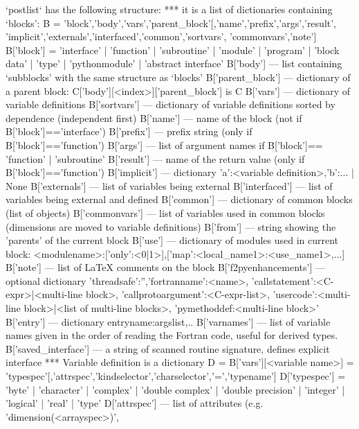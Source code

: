 \begin{DoxyVerb}
  `postlist` has the following structure:
 *** it is a list of dictionaries containing `blocks':
     B = {'block','body','vars','parent_block'[,'name','prefix','args','result',
  'implicit','externals','interfaced','common','sortvars',
  'commonvars','note']}
     B['block'] = 'interface' | 'function' | 'subroutine' | 'module' |
          'program' | 'block data' | 'type' | 'pythonmodule' |
          'abstract interface'
     B['body'] --- list containing `subblocks' with the same structure as `blocks'
     B['parent_block'] --- dictionary of a parent block:
                     C['body'][<index>]['parent_block'] is C
     B['vars'] --- dictionary of variable definitions
     B['sortvars'] --- dictionary of variable definitions sorted by dependence (independent first)
     B['name'] --- name of the block (not if B['block']=='interface')
     B['prefix'] --- prefix string (only if B['block']=='function')
     B['args'] --- list of argument names if B['block']== 'function' | 'subroutine'
     B['result'] --- name of the return value (only if B['block']=='function')
     B['implicit'] --- dictionary {'a':<variable definition>,'b':...} | None
     B['externals'] --- list of variables being external
     B['interfaced'] --- list of variables being external and defined
     B['common'] --- dictionary of common blocks (list of objects)
     B['commonvars'] --- list of variables used in common blocks (dimensions are moved to variable definitions)
     B['from'] --- string showing the 'parents' of the current block
     B['use'] --- dictionary of modules used in current block:
 {<modulename>:{['only':<0|1>],['map':{<local_name1>:<use_name1>,...}]}}
     B['note'] --- list of LaTeX comments on the block
     B['f2pyenhancements'] --- optional dictionary
  {'threadsafe':'','fortranname':<name>,
   'callstatement':<C-expr>|<multi-line block>,
   'callprotoargument':<C-expr-list>,
   'usercode':<multi-line block>|<list of multi-line blocks>,
   'pymethoddef:<multi-line block>'
   }
     B['entry'] --- dictionary {entryname:argslist,..}
     B['varnames'] --- list of variable names given in the order of reading the
               Fortran code, useful for derived types.
     B['saved_interface'] --- a string of scanned routine signature, defines explicit interface
 *** Variable definition is a dictionary
     D = B['vars'][<variable name>] =
     {'typespec'[,'attrspec','kindselector','charselector','=','typename']}
     D['typespec'] = 'byte' | 'character' | 'complex' | 'double complex' |
             'double precision' | 'integer' | 'logical' | 'real' | 'type'
     D['attrspec'] --- list of attributes (e.g. 'dimension(<arrayspec>)',

\end{DoxyVerb}
